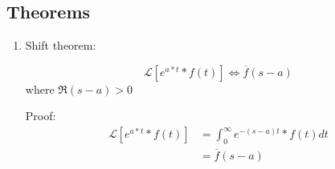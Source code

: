\documentclass[10pt,a4paper]{article}
\begin{document}
 \subsection{Theorems}
 \begin{enumerate}
     \item Shift theorem:
     \begin{tcolorbox}[breakable,colback=white,colframe=black,width=\dimexpr\textwidth+12mm\relax,enlarge left by=-6mm]
        \begin{equation*} 
        \mathcal{L}[e^{a*t}*f(t)] \Leftrightarrow \overline{f}(s-a)
        \end{equation*}
        where $\Re(s-a)>0$
     \end{tcolorbox}
     Proof: 
     \begin{equation*} 
        \begin{aligned}
            \mathcal{L}[e^{a*t}*f(t)] &= \int_0^{\infty}e^{-(s-a)t}*f(t) dt \\
            &= \overline{f}(s-a)
        \end{aligned}
     \end{equation*}


\end{enumerate}
\end{document}
